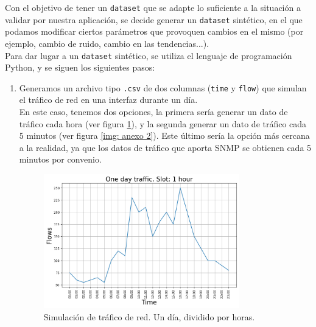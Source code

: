 \documentclass[a4paper, oneside, 12pt]{book}
\begin{document}
	\noindent Con el objetivo de tener un \texttt{dataset} que se adapte lo suficiente a la situación a validar por nuestra aplicación, se decide generar un \texttt{dataset} sintético, en el que podamos modificar ciertos parámetros que provoquen cambios en el mismo (por ejemplo, cambio de ruido, cambio en las tendencias...). \\
	
	\noindent Para dar lugar a un \texttt{dataset} sintético, se utiliza el lenguaje de programación Python, y se siguen los siguientes pasos: 
	
	\begin{enumerate}
		\item Generamos un archivo tipo \texttt{.csv} de dos columnas (\texttt{time} y \texttt{flow}) que simulan el tráfico de red en una interfaz durante un día. \\
		
		\noindent En este caso, tenemos dos opciones, la primera sería generar un dato de tráfico cada hora (ver figura \ref{img: anexo 1}), y la segunda generar un dato de tráfico cada 5 minutos (ver figura \ref{img: anexo 2}). Este último sería la opción más cercana a la realidad, ya que los datos de tráfico que aporta SNMP se obtienen cada 5 minutos por convenio.
		
		\begin{figure}[h!]
			\includegraphics[width=0.8\textwidth, center]{img/anexo_1.png}
			\caption{Simulación de tráfico de red. Un día, dividido por horas.}
			\label{img: anexo 1}
		\end{figure}
	
		\pagebreak
		

\end{enumerate}
\end{document}
